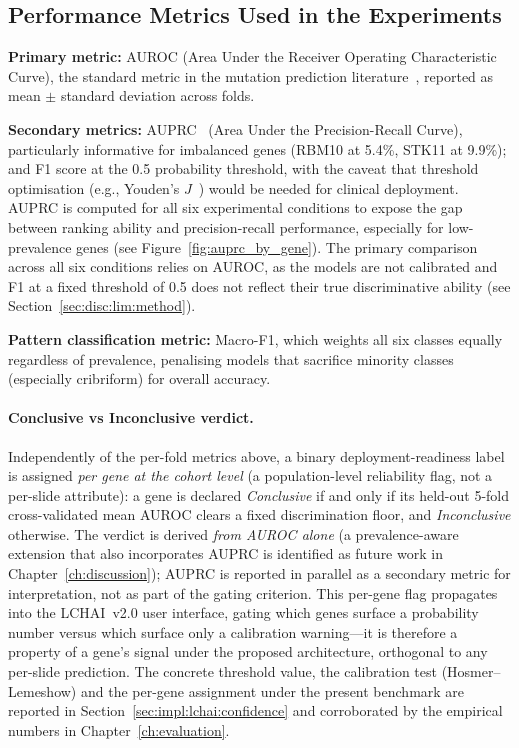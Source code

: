 \subsection{Performance Metrics Used in the Experiments}
\label{sec:meth:eval:metrics}

\textbf{Primary metric:} AUROC (Area Under the Receiver Operating
Characteristic Curve), the standard metric in the mutation prediction
literature~\cite{coudray2018classification,kather2020pancancer}, reported as mean $\pm$ standard deviation across folds.

\textbf{Secondary metrics:} AUPRC~\cite{davis2006auprc} (Area Under the Precision-Recall
Curve), particularly informative for imbalanced genes (RBM10 at 5.4\%,
STK11 at 9.9\%);
and F1 score at the 0.5 probability threshold, with the caveat that
threshold optimisation (e.g., Youden's $J$~\cite{youden1950index}) would be needed for
clinical deployment.
AUPRC is computed for all six experimental conditions to expose
the gap between ranking ability and precision-recall performance,
especially for low-prevalence genes (see Figure~\ref{fig:auprc_by_gene}).
The primary comparison across all six conditions relies on AUROC,
as the models are not calibrated and F1 at a fixed threshold of 0.5
does not reflect their true discriminative ability
(see Section~\ref{sec:disc:lim:method}).

\textbf{Pattern classification metric:} Macro-F1, which weights all six
classes equally regardless of prevalence, penalising models that sacrifice
minority classes (especially cribriform) for overall accuracy.

\paragraph{Conclusive vs Inconclusive verdict.}
Independently of the per-fold metrics above, a binary
deployment-readiness label is assigned \emph{per gene at the cohort
level} (a population-level reliability flag, not a per-slide
attribute): a gene is declared \emph{Conclusive} if and only if its
held-out 5-fold cross-validated mean AUROC clears a fixed
discrimination floor, and \emph{Inconclusive} otherwise.
The verdict is derived \emph{from AUROC alone} (a prevalence-aware
extension that also incorporates AUPRC is identified as future work
in Chapter~\ref{ch:discussion}); AUPRC is reported in parallel as a
secondary metric for interpretation, not as part of the gating
criterion.
This per-gene flag propagates into the LCHAI~v2.0 user interface,
gating which genes surface a probability number versus which surface
only a calibration warning---it is therefore a property of a gene's
signal under the proposed architecture, orthogonal to any per-slide
prediction.
The concrete threshold value, the calibration test
(Hosmer--Lemeshow) and the per-gene assignment under the present
benchmark are reported in
Section~\ref{sec:impl:lchai:confidence} and corroborated by the
empirical numbers in Chapter~\ref{ch:evaluation}.

